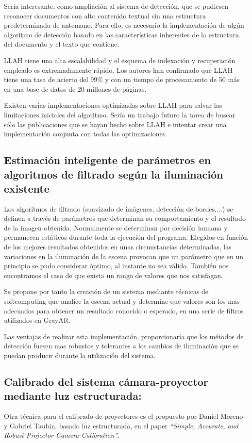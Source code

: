 Sería interesante, como ampliación al sistema de detección, que se pudiesen reconocer documentos con alto contenido textual sin una estructura predeterminada de antemano. Para ello, es necesario la implementación de algún algoritmo de detección basado en las características inherentes de la estructura del documento y el texto que contiene. 

LLAH \cite{Nakai} tiene una alta escalabilidad y el esquema de indexación y recuperación empleado es extremadamente rápido. Los autores han confirmado que LLAH tiene una tasa de acierto del 99\% y con un tiempo de procesamiento de 50 más en una base de datos de 20 millones de páginas. 

Existen varias implementaciones optimizadas sobre LLAH para salvar las limitaciones iniciales del algoritmo. Sería un trabajo futuro la tarea de buscar sólo las publicaciones que se hayan hecho sobre LLAH e intentar crear una implementación conjunta con todas las optimizaciones.

\subsection{Estimación inteligente de parámetros en algoritmos de filtrado según la iluminación existente}
Los algoritmos de filtrado (suavizado de imágenes, detección de bordes,...) se definen a través de parámetros que determinan su comportamiento y el resultado de la imagen obtenida. Normalmente se determinan por decisión humana y permanecen estáticos durante toda la ejecución del programa. Elegidos en función de los mejores resultados obtenidos en unas circunstancias determinadas, las variaciones en la iluminación de la escena provocan que un parámetro que en un principio se pudo considerar óptimo, al instante no sea válido. También nos encontramos el caso de que exista un rango de valores que nos satisfagan.

Se propone por tanto la creación de un sistema mediante técnicas de softcomputing que analice la escena actual y determine que valores son los mas adecuados para obtener un resultado conocido o esperado, en una serie de filtros utilizados en GrayAR.

Las ventajas de realizar esta implementación, proporcionaría que los métodos de detección fuesen mas robustos y tolerantes a los cambios de iluminación que se puedan producir durante la utilización del sistema.    

\subsection{Calibrado del sistema cámara-proyector mediante luz estructurada:} 
Otra técnica para el calibrado de proyectores es el propuesto por Daniel Moreno y Gabriel Taubin, basado luz estructurada, en el paper \textit{``Simple, Accurate, and Robust Projector-Camera Calibration''}. 

